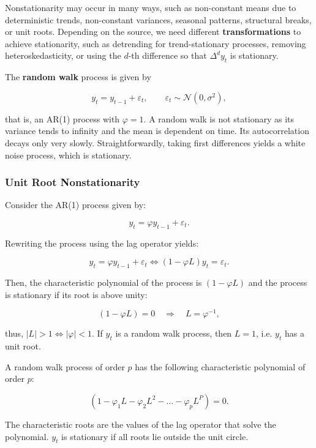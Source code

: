 Nonstationarity may occur in many ways, such as non-constant means due to deterministic trends, non-constant variances, seasonal patterns, structural breaks, or unit roots. Depending on the source, we need different \textbf{transformations} to achieve stationarity, such as detrending for trend-stationary processes, removing heteroskedasticity, or using the $d$-th difference so that $\Delta^dy_t$ is stationary.

The \textbf{random walk} process is given by

\begin{equation}
	y_t = y_{t-1} + \varepsilon_t, \qquad \varepsilon_t \sim \mathcal{N}(0,\sigma^2),
\end{equation}

that is, an AR(1) process with $\varphi = 1$. A random walk is not stationary as its variance tends to infinity and the mean is dependent on time. Its autocorrelation decays only very slowly. Straightforwardly, taking first differences yields a white noise process, which is stationary.

\subsubsection{Unit Root Nonstationarity}

Consider the AR(1) process given by:

\[
	y_t = \varphi y_{t-1} + \varepsilon_t.
\]

Rewriting the process using the lag operator yields:

\[
	y_t = \varphi y_{t-1} + \varepsilon_t \Leftrightarrow (1-\varphi L)y_t = \varepsilon_t.
\]

Then, the characteristic polynomial of the process is $(1-\varphi L)$ and the process is stationary if its root is above unity:

\[
	(1-\varphi L) = 0 \quad \Rightarrow \quad L = \varphi^{-1},
\]

thus, $|L|>1 \Leftrightarrow |\varphi| < 1$. If $y_t$ is a random walk process, then $L=1$, i.e. $y_t$ has a unit root. 

A random walk process of order $p$ has the following characteristic polynomial of order $p$:

\[
	(1-\varphi_1L - \varphi_2L^2 - \ldots - \varphi_pL^P) = 0.
\]

The characteristic roots are the values of the lag operator that solve the polynomial. $y_t$ is stationary if all roots lie outside the unit circle. 

